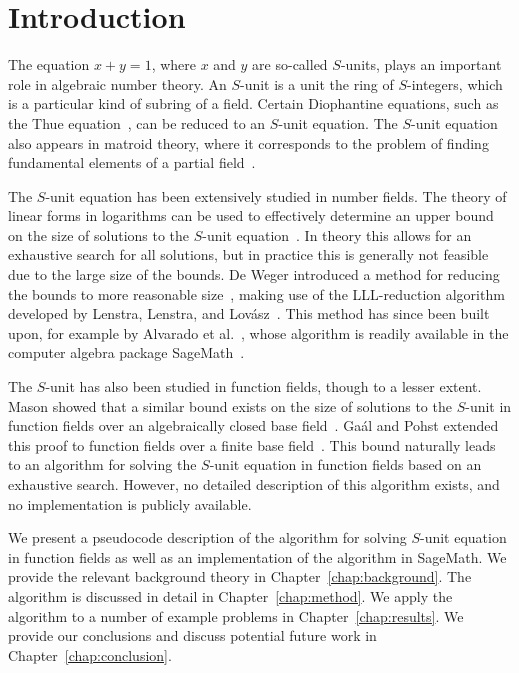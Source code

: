 
\chapter{Introduction}%
\label{chap:introduction}

The equation \(x + y = 1\), where \(x\) and \(y\) are so-called \(S\)-units, plays an important role in algebraic number theory. An \(S\)-unit is a unit the ring of \(S\)-integers, which is a particular kind of subring of a field. Certain Diophantine equations, such as the Thue equation~\cite{thue-1909-uber-annaherungsweerte-algebraischer}, can be reduced to an \(S\)-unit equation. The \(S\)-unit equation also appears in matroid theory, where it corresponds to the problem of finding fundamental elements of a partial field~\cite{zwam-2009-partial-fields-in}.

The \(S\)-unit equation has been extensively studied in number fields. The theory of linear forms in logarithms can be used to effectively determine an upper bound on the size of solutions to the \(S\)-unit equation~\cite{gyory-1979-on-the-number}. In theory this allows for an exhaustive search for all solutions, but in practice this is generally not feasible due to the large size of the bounds. De Weger introduced a method for reducing the bounds to more reasonable size~\cite{weger-1989-algorithms-for-diophantine}, making use of the LLL-reduction algorithm developed by Lenstra, Lenstra, and Lov\'{a}sz~\cite{lenstra-1982-factoring-polynomials-with}. This method has since been built upon, for example by Alvarado et al.~\cite{alvarado-2021-a-robust-implementation}, whose algorithm is readily available in the computer algebra package SageMath~\cite{sagemath}.

The \(S\)-unit has also been studied in function fields, though to a lesser extent. Mason showed that a similar bound exists on the size of solutions to the \(S\)-unit in function fields over an algebraically closed base field~\cite{mason-1984-diophantine-equations-over}. Ga\'{a}l and Pohst extended this proof to function fields over a finite base field~\cite{gaal-2006-diophantine-equations-over}. This bound naturally leads to an algorithm for solving the \(S\)-unit equation in function fields based on an exhaustive search. However, no detailed description of this algorithm exists, and no implementation is publicly available.

We present a pseudocode description of the algorithm for solving \(S\)-unit equation in function fields as well as an implementation of the algorithm in SageMath. We provide the relevant background theory in Chapter~\ref{chap:background}. The algorithm is discussed in detail in Chapter~\ref{chap:method}. We apply the algorithm to a number of example problems in Chapter~\ref{chap:results}. We provide our conclusions and discuss potential future work in Chapter~\ref{chap:conclusion}.
